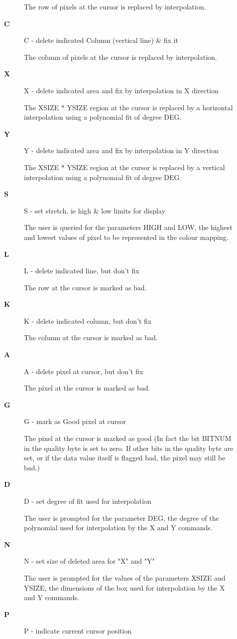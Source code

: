\begin{description}
\begin{description}
    The row of pixels at the cursor is replaced by interpolation.
\item [\textbf{C}]
 C - delete indicated Column (vertical line) \& fix it

    The column of pixels at the cursor is replaced by interpolation.
\item [\textbf{X}]
 X - delete indicated area and fix by interpolation in X direction

    The XSIZE * YSIZE region at the cursor is replaced by a horizontal
    interpolation using a polynomial fit of degree DEG.
\item [\textbf{Y}]
 Y - delete indicated area and fix by interpolation in Y direction

    The XSIZE * YSIZE region at the cursor is replaced by a vertical
    interpolation using a polynomial fit of degree DEG.
\item [\textbf{S}]
 S - set stretch, ie high \& low limits for display

    The user is queried for the parameters HIGH and LOW, the highest
    and lowest values of pixel to be represented in the colour mapping.
\item [\textbf{L}]
 L - delete indicated line, but don't fix

    The row at the cursor is marked as bad.
\item [\textbf{K}]
 K - delete indicated column, but don't fix

    The column at the cursor is marked as bad.
\item [\textbf{A}]
 A - delete pixel at cursor, but don't fix

    The pixel at the cursor is marked as bad.
\item [\textbf{G}]
 G - mark as Good pixel at cursor

    The pixel at the cursor is marked as good (In fact the bit BITNUM
    in the quality byte is set to zero.  If other bits in the quality
    byte are set, or if the data value itself is flagged bad, the
    pixel may still be bad.)
\item [\textbf{D}]
 D - set degree of fit used for interpolation

    The user is prompted for the parameter DEG, the degree of the
    polynomial used for interpolation by the X and Y commands.
\item [\textbf{N}]
 N - set size of deleted area for "X" and "Y"

    The user is prompted for the values of the parameters XSIZE and
    YSIZE, the dimensions of the box used for interpolation by the
    X and Y commands.
\item [\textbf{P}]
 P - indicate current cursor position


\end{description}
\end{description}
